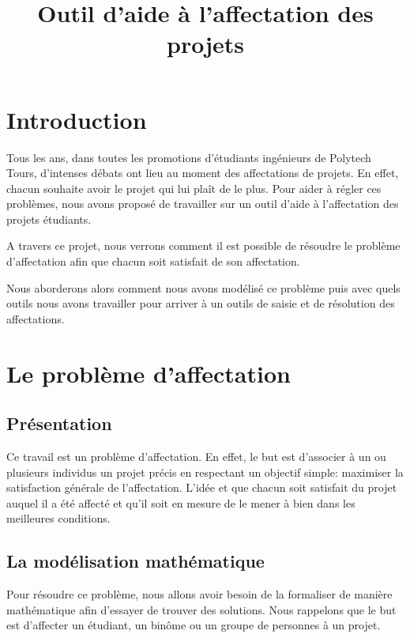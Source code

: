 \documentclass{polytech/polytech}
\title{Outil d'aide à l'affectation des projets}
\begin{document}

\chapter*{Introduction}
\label{chap:intro}

Tous les ans, dans toutes les promotions d'étudiants ingénieurs de Polytech Tours, d'intenses débats ont lieu au moment des affectations de projets. En effet, chacun souhaite avoir le projet qui lui plaît de le plus. Pour aider à régler ces problèmes, nous avons proposé de travailler sur un outil d'aide à l'affectation des projets étudiants. 

A travers ce projet, nous verrons comment il est possible de résoudre le problème d'affectation afin que chacun soit satisfait de son affectation.

Nous aborderons alors comment nous avons modélisé ce problème puis avec quels outils nous avons travailler pour arriver à un outils de saisie et de résolution des affectations.

\chapter{Le problème d'affectation}
\label{chap:pb_affectation}

\section{Présentation}
\label{sec:pres_affectation}

Ce travail est un problème d'affectation.
En effet, le but est d'associer à un ou plusieurs individus un projet précis en respectant un objectif simple: maximiser la satisfaction générale de l'affectation.
L'idée et que chacun soit satisfait du projet auquel il a été affecté et qu'il soit en mesure de le mener à bien dans les meilleures conditions.


\section{La modélisation mathématique}
\label{sec:mod_math}

Pour résoudre ce problème, nous allons avoir besoin de la formaliser de manière mathématique afin d'essayer de trouver des solutions.
Nous rappelons que le but est d'affecter un étudiant, un binôme ou un groupe de personnes à un projet.
\end{document}

